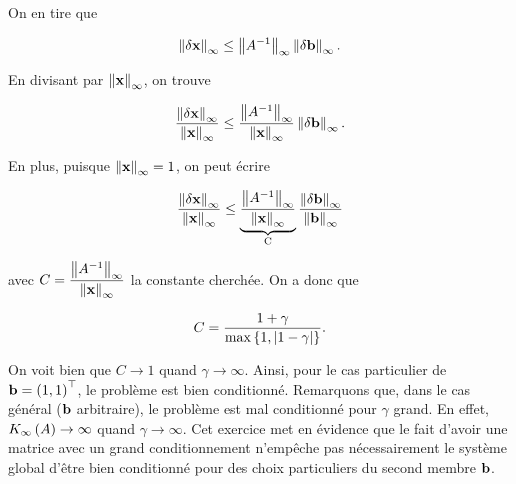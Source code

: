 On en tire que 

\begin{equation*}
  \left\lVert\delta \mathbf{x}\right\rVert_{\infty}
  \leq \left\lVert A^{-1}\right\rVert_{\infty} \left\lVert\delta \mathbf{b}\right\rVert_{\infty}.
\end{equation*}

En divisant par $\left\lVert\mathbf{x}\right\rVert_{\infty}$, on trouve 

\begin{equation*}
  \dfrac{\left\lVert\delta \mathbf{x}\right\rVert_{\infty}}{\left\lVert\mathbf{x}\right\rVert_{\infty}}
  \leq \dfrac{\left\lVert A^{-1}\right\rVert_{\infty}}{\left\lVert\mathbf{x}\right\rVert_{\infty}} \left\lVert\delta \mathbf{b}\right\rVert_{\infty}.
\end{equation*}

En plus, puisque $\left\lVert\mathbf{x}\right\rVert_{\infty} = 1$, on peut écrire

\begin{equation*}
  \dfrac{\left\lVert\delta \mathbf{x}\right\rVert_{\infty}}{\left\lVert\mathbf{x}\right\rVert_{\infty}}
  \leq \underbrace{\dfrac{\left\lVert A^{-1}\right\rVert_{\infty}}{\left\lVert\mathbf{x}\right\rVert_{\infty}}}_\text{C}
  \dfrac{\left\lVert\delta \mathbf{b}\right\rVert_{\infty}}{\left\lVert\mathbf{b}\right\rVert_{\infty}}
\end{equation*}

avec $C = \dfrac{\left\lVert A^{-1}\right\rVert_{\infty}}{\left\lVert\mathbf{x}\right\rVert_{\infty}}$ la constante cherchée.
On a donc que 

\begin{equation*}
  C = \dfrac{1 + \gamma}{\max \left\{1, \left\lvert1 - \gamma\right\rvert\right\}}.
\end{equation*}

On voit bien que $C \rightarrow 1$ quand $\gamma \rightarrow \infty$.
Ainsi, pour le cas particulier de $\mathbf{b} = \left(1, 1\right)^{\top}$, le problème est bien conditionné.
Remarquons que, dans le cas général ($\mathbf{b}$ arbitraire), le problème est mal conditionné pour $\gamma$ grand.
En effet, $K_{\infty} \left(A\right) \rightarrow \infty$ quand $\gamma \rightarrow \infty$.
Cet exercice met en évidence que le fait d'avoir une matrice avec un grand conditionnement n'empêche pas nécessairement le système global d'être bien conditionné pour des choix particuliers du second membre $\mathbf{b}$.











